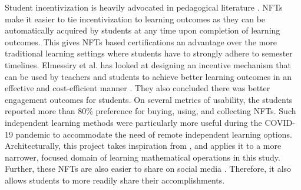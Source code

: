 \documentclass[acmsmall,nonacm]{acmart}
\begin{document}
Student incentivization is heavily advocated in pedagogical literature \cite{gass2019using}. NFTs make it easier to tie incentivization to learning outcomes as they can be automatically acquired by students at any time upon completion of learning outcomes. This gives NFTs based certifications an advantage over the more traditional learning settings where students have to strongly adhere to semester timelines. Elmessiry et al. has looked at designing an incentive mechanism that can be used by teachers and students to achieve better learning outcomes in an effective and cost-efficient manner \cite{elmessiry2021nft}. They also concluded there was better engagement outcomes for students. On several metrics of usability, the students reported more than 80\% preference for buying, using, and collecting NFTs. Such independent learning methods were particularly more useful during the COVID-19 pandemic to accommodate the need of remote independent learning options. Architecturally, this project takes inspiration from \cite{elmessiry2021nft}, and applies it to a more narrower, focused domain of learning mathematical operations in this study. Further, these NFTs are also easier to share on social media \cite{kapoor2022tweetboost}. Therefore, it also allows students to more readily share their accomplishments. 
\end{document}
